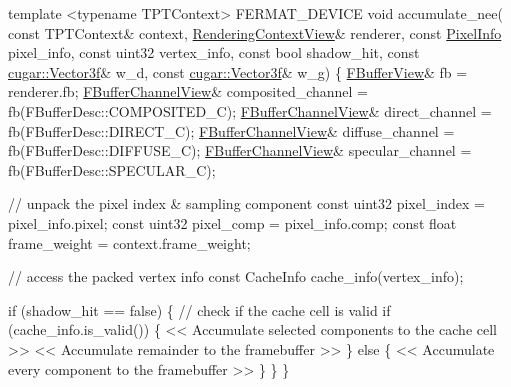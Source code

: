 \begin{DoxyCode}
\textcolor{keyword}{template} <\textcolor{keyword}{typename} TPTContext>
FERMAT\_DEVICE
\textcolor{keywordtype}{void} accumulate\_nee(
   \textcolor{keyword}{const} TPTContext&           context,
         \hyperlink{struct_rendering_context_view}{RenderingContextView}& renderer,
   \textcolor{keyword}{const} \hyperlink{union_pixel_info}{PixelInfo}             pixel\_info,
   \textcolor{keyword}{const} uint32                vertex\_info,
   \textcolor{keyword}{const} \textcolor{keywordtype}{bool}                  shadow\_hit,
   \textcolor{keyword}{const} \hyperlink{structcugar_1_1_vector}{cugar::Vector3f}&      w\_d,
   \textcolor{keyword}{const} \hyperlink{structcugar_1_1_vector}{cugar::Vector3f}&      w\_g)
\{
   \hyperlink{struct_f_buffer_view}{FBufferView}& fb = renderer.fb;
   \hyperlink{struct_f_buffer_channel_view}{FBufferChannelView}& composited\_channel = fb(FBufferDesc::COMPOSITED\_C);
   \hyperlink{struct_f_buffer_channel_view}{FBufferChannelView}& direct\_channel     = fb(FBufferDesc::DIRECT\_C);
   \hyperlink{struct_f_buffer_channel_view}{FBufferChannelView}& diffuse\_channel    = fb(FBufferDesc::DIFFUSE\_C);
   \hyperlink{struct_f_buffer_channel_view}{FBufferChannelView}& specular\_channel   = fb(FBufferDesc::SPECULAR\_C);

       \textcolor{comment}{// unpack the pixel index & sampling component}
   \textcolor{keyword}{const} uint32 pixel\_index = pixel\_info.pixel;
   \textcolor{keyword}{const} uint32 pixel\_comp  = pixel\_info.comp;
   \textcolor{keyword}{const} \textcolor{keywordtype}{float} frame\_weight = context.frame\_weight;

   \textcolor{comment}{// access the packed vertex info}
   \textcolor{keyword}{const} CacheInfo cache\_info(vertex\_info);

   \textcolor{keywordflow}{if} (shadow\_hit == \textcolor{keyword}{false})
   \{       
       \textcolor{comment}{// check if the cache cell is valid}
       \textcolor{keywordflow}{if} (cache\_info.is\_valid())
       \{
           << Accumulate selected components to the cache cell >>
           << Accumulate remainder to the framebuffer >>
       \}
       \textcolor{keywordflow}{else}
       \{
           << Accumulate every component to the framebuffer >>
       \}
   \}
\}
\end{DoxyCode}


